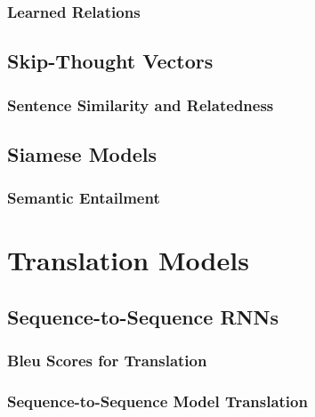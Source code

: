 			\subsubsection{Learned Relations} %

		\subsection{Skip-Thought Vectors} %

			\subsubsection{Sentence Similarity and Relatedness} %

		\subsection{Siamese Models} %

			\subsubsection{Semantic Entailment} %

	\section{Translation Models} %

		\subsection{Sequence-to-Sequence RNNs} %

			\subsubsection{Bleu Scores for Translation} %

			\subsubsection{Sequence-to-Sequence Model Translation} %

